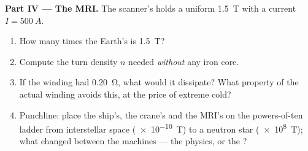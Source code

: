 \begin{problem}
\medskip
\noindent\textbf{Part IV --- The MRI.}
The scanner's  holds a uniform \qty{1.5}{T} with a current
$I = \qty{500}{A}$.
\begin{enumerate}[resume]
  \item How many times the Earth's  is \qty{1.5}{T}?
  \item Compute the turn density $n$ needed \emph{without} any iron core.
  \item If the winding had  \qty{0.20}{\ohm}, what 
        would it dissipate? What property of the actual winding avoids
        this, at the price of extreme cold?
  \item Punchline: place the ship's, the crane's and the MRI's 
        on the powers-of-ten ladder from interstellar space
        (\qty{e-10}{T}) to a neutron star (\qty{e8}{T}); what changed
        between the machines --- the physics, or the ?
\end{enumerate}
\end{problem}
